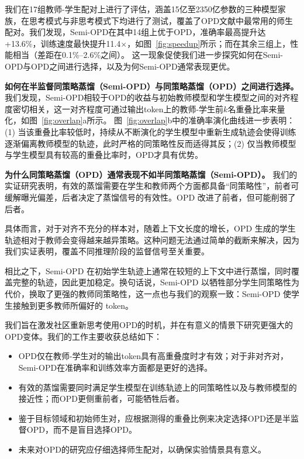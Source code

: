 我们在17组教师-学生配对上进行了评估，涵盖15亿至2350亿参数的三种模型家族，在思考模式与非思考模式下均进行了测试，覆盖了OPD文献中最常用的师生配对。我们发现，Semi-OPD在其中14组上优于OPD，准确率最高提升达+13.6\%，训练速度最快提升11.4$\times$，如图~\ref{fig:speedup}所示；而在其余三组上，性能相当（差距在0.1\%--2.6\%之间）。  
这一现象促使我们进一步探究如何在Semi-OPD与OPD之间进行选择，以及为何Semi-OPD通常表现更优。


\noindent \textbf{如何在半监督同策略蒸馏（Semi-OPD）与同策略蒸馏（OPD）之间进行选择。}
我们发现，Semi-OPD相较于OPD的收益与初始教师模型和学生模型之间的对齐程度密切相关，这一对齐程度可通过输出token上的教师-学生前$k$名重叠比率来量化，如图~\ref{fig:overlap}a所示。
图~\ref{fig:overlap}b中的准确率演化曲线进一步表明：(1) 当该重叠比率较低时，持续从不断演化的学生模型中重新生成轨迹会使得训练逐渐偏离教师模型的轨迹，此时严格的同策略性反而适得其反；(2) 仅当教师模型与学生模型具有较高的重叠比率时，OPD才具有优势。 


\noindent \textbf{为什么同策略蒸馏（OPD）通常表现不如半同策略蒸馏（Semi-OPD）。} 我们的实证研究表明，有效的蒸馏需要在学生和教师两个方面都具备“同策略性”，前者可缓解曝光偏差，后者决定了蒸馏信号的有效性。OPD 改进了前者，但可能削弱了后者。

具体而言，对于对齐不充分的样本对，随着上下文长度的增长，OPD 生成的学生轨迹相对于教师会变得越来越异策略。这种问题无法通过简单的截断来解决，因为我们实证表明，覆盖不同推理阶段的监督信号至关重要。

相比之下，Semi-OPD 在初始学生轨迹上通常在较短的上下文中进行蒸馏，同时覆盖完整的轨迹，因此更加稳定。换句话说，Semi-OPD 以牺牲部分学生同策略性为代价，换取了更强的教师同策略性，这一点也与我们的观察一致：Semi-OPD 使学生接触到更多教师所偏好的 token。


我们旨在激发社区重新思考使用OPD的时机，并在有意义的情景下研究更强大的OPD变体。我们的工作主要收获总结如下：


\begin{itemize}[leftmargin=1.2em]
\vspace{-1em}
\item OPD仅在教师-学生对的输出token具有高重叠度时才有效；对于非对齐对，Semi-OPD在准确率和训练效率方面都是更好的选择。

\item 有效的蒸馏需要同时满足学生模型在训练轨迹上的同策略性以及与教师模型的接近性；而OPD更侧重前者，可能牺牲后者。

\item 鉴于目标领域和初始师生对，应根据测得的重叠比例来决定选择OPD还是半监督OPD，而不是盲目选择OPD。

\item 未来对OPD的研究应仔细选择师生配对，以确保实验情景具有意义。

\end{itemize}

